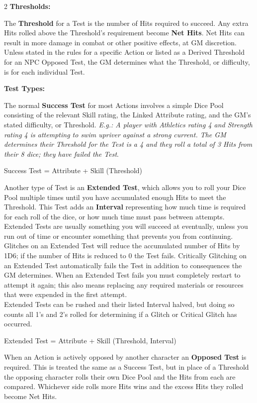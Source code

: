 \documentclass[
  oneside]{article}
\begin{document}
\begin{multicols}{2}
\textbf{Thresholds:}

The \textbf{Threshold} for a Test is the number of
Hits required to succeed. Any extra Hits rolled
above the Threshold's requirement become
\textbf{Net Hits}. Net Hits can result in more
damage in combat or other positive effects, at GM
discretion. Unless stated in the rules for a
specific Action or listed as a Derived Threshold
for an NPC Opposed Test, the GM determines what
the Threshold, or difficulty, is for each
individual Test.

\textbf{Test Types:}

The normal \textbf{Success Test} for most Actions
involves a simple Dice Pool consisting of the
relevant Skill rating, the Linked Attribute
rating, and the GM's stated difficulty, or
Threshold. \emph{E.g.: A player with Athletics
rating 4 and Strength rating 4 is attempting to
swim upriver against a strong current. The GM
determines their Threshold for the Test is a 4 and
they roll a total of 3 Hits from their 8 dice;
they have failed the Test}.

Success Test = Attribute + Skill (Threshold)

Another type of Test is an \textbf{Extended Test},
which allows you to roll your Dice Pool multiple
times until you have accumulated enough Hits to
meet the Threshold. This Test adds an
\textbf{Interval} representing how much time is
required for each roll of the dice, or how much
time must pass between attempts. Extended Tests
are usually something you will succeed at
eventually, unless you run out of time or
encounter something that prevents you from
continuing. Glitches on an Extended Test will
reduce the accumulated number of Hits by 1D6; if
the number of Hits is reduced to 0 the Test fails.
Critically Glitching on an Extended Test
automatically fails the Test in addition to
consequences the GM determines. When an Extended
Test fails you must completely restart to attempt
it again; this also means replacing any required
materials or resources that were expended in the
first attempt.\\
Extended Tests can be rushed and their listed
Interval halved, but doing so counts all 1's and
2's rolled for determining if a Glitch or Critical
Glitch has occurred.

Extended Test = Attribute + Skill (Threshold,
Interval)

When an Action is actively opposed by another
character an \textbf{Opposed Test} is required.
This is treated the same as a Success Test, but in
place of a Threshold the opposing character rolls
their own Dice Pool and the Hits from each are
compared. Whichever side rolls more Hits wins and
the excess Hits they rolled become Net Hits.


\end{multicols}
\end{document}
